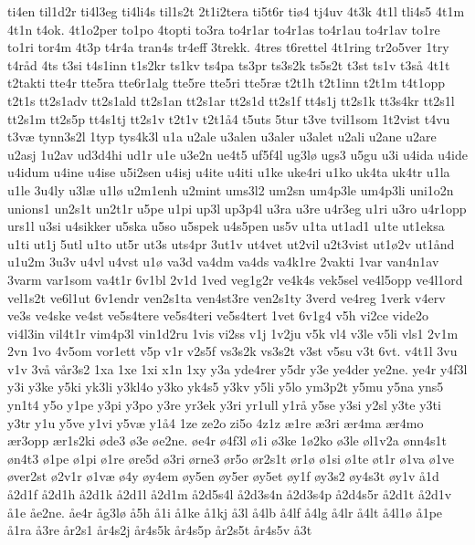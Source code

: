 {ti4en
til1d2r
ti4l3eg
ti4li4s
til1s2t
2t1i2tera
ti5t6r
ti^^f84
tj4uv
4t3k
4t1l
tli4s5
4t1m
4t1n
t4ok.
4t1o2per
to1po
4topti
to3ra
to4r1ar
to4r1as
to4r1au
to4r1av
to1re
to1ri
tor4m
4t3p
t4r4a
tran4s
tr4eff
3trekk.
4tres
t6rettel
4t1ring
tr2o5ver
1try
t4r^^e5d
4ts
t3si
t4s1inn
t1s2kr
ts1kv
ts4pa
ts3pr
ts3s2k
ts5s2t
t3st
ts1v
t3s^^e5
4t1t
t2takti
tte4r
tte5ra
tte6r1alg
tte5re
tte5ri
tte5r^^e6
t2t1h
t2t1inn
t2t1m
t4t1opp
t2t1s
tt2s1adv
tt2s1ald
tt2s1an
tt2s1ar
tt2s1d
tt2s1f
tt4s1j
tt2s1k
tt3s4kr
tt2s1l
tt2s1m
tt2s5p
tt4s1tj
tt2s1v
t2t1v
t2t1^^e54
t5uts
5tur
t3ve
tvil1som
1t2vist
t4vu
t3v^^e6
tynn3s2l
1typ
tys4k3l
u1a
u2ale
u3alen
u3aler
u3alet
u2ali
u2ane
u2are
u2asj
1u2av
ud3d4hi
ud1r
u1e
u3e2n
ue4t5
uf5f4l
ug3l^^f8
ugs3
u5gu
u3i
u4ida
u4ide
u4idum
u4ine
u4ise
u5i2sen
u4isj
u4ite
u4iti
u1ke
uke4ri
u1ko
uk4ta
uk4tr
u1la
u1le
3u4ly
u3l^^e6
u1l^^f8
u2m1enh
u2mint
ums3l2
um2sn
um4p3le
um4p3li
uni1o2n
unions1
un2s1t
un2t1r
u5pe
u1pi
up3l
up3p4l
u3ra
u3re
u4r3eg
u1ri
u3ro
u4r1opp
urs1l
u3si
u4sikker
u5ska
u5so
u5spek
u4s5pen
us5v
u1ta
ut1ad1
u1te
ut1eksa
u1ti
ut1j
5utl
u1to
ut5r
ut3s
uts4pr
3ut1v
ut4vet
ut2vil
u2t3vist
ut1^^f82v
ut1^^e5nd
u1u2m
3u3v
u4vl
u4vst
u1^^f8
va3d
va4dm
va4ds
va4k1re
2vakti
1var
van4n1av
3varm
var1som
va4t1r
6v1bl
2v1d
1ved
veg1g2r
ve4k4s
vek5sel
ve4l5opp
ve4l1ord
vel1s2t
ve6l1ut
6v1endr
ven2s1ta
ven4st3re
ven2s1ty
3verd
ve4reg
1verk
v4erv
ve3s
ve4ske
ve4st
ve5s4tere
ve5s4teri
ve5s4tert
1vet
6v1g4
v5h
vi2ce
vide2o
vi4l3in
vil4t1r
vim4p3l
vin1d2ru
1vis
vi2ss
v1j
1v2ju
v5k
vl4
v3le
v5li
vls1
2v1m
2vn
1vo
4v5om
vor1ett
v5p
v1r
v2s5f
vs3s2k
vs3s2t
v3st
v5su
v3t
6vt.
v4t1l
3vu
v1v
3v^^e5
v^^e5r3s2
1xa
1xe
1xi
x1n
1xy
y3a
yde4rer
y5dr
y3e
ye4der
ye2ne.
ye4r
y4f3l
y3i
y3ke
y5ki
yk3li
y3kl4o
y3ko
yk4s5
y3kv
y5li
y5lo
ym3p2t
y5mu
y5na
yns5
yn1t4
y5o
y1pe
y3pi
y3po
y3re
yr3ek
y3ri
yr1ull
y1r^^e5
y5se
y3si
y2sl
y3te
y3ti
y3tr
y1u
y5ve
y1vi
y5v^^e6
y1^^e54
1ze
ze2o
zi5o
4z1z
^^e61re
^^e63ri
^^e6r4ma
^^e6r4mo
^^e6r3opp
^^e6r1s2ki
^^f8de3
^^f83e
^^f8e2ne.
^^f8e4r
^^f84f3l
^^f81i
^^f83ke
1^^f82ko
^^f83le
^^f8l1v2a
^^f8nn4s1t
^^f8n4t3
^^f81pe
^^f81pi
^^f81re
^^f8re5d
^^f83ri
^^f8rne3
^^f8r5o
^^f8r2s1t
^^f8r1^^f8
^^f81si
^^f81te
^^f8t1r
^^f81va
^^f81ve
^^f8ver2st
^^f82v1r
^^f81v^^e6
^^f84y
^^f8y4em
^^f8y5en
^^f8y5er
^^f8y5et
^^f8y1f
^^f8y3s2
^^f8y4s3t
^^f8y1v
^^e51d
^^e52d1f
^^e52d1h
^^e52d1k
^^e52d1l
^^e52d1m
^^e52d5s4l
^^e52d3s4n
^^e52d3s4p
^^e52d4s5r
^^e52d1t
^^e52d1v
^^e51e
^^e5e2ne.
^^e5e4r
^^e5g3l^^f8
^^e55h
^^e51i
^^e51ke
^^e51kj
^^e53l
^^e54lb
^^e54lf
^^e54lg
^^e54lr
^^e54lt
^^e54l1^^f8
^^e51pe
^^e51ra
^^e53re
^^e5r2s1
^^e5r4s2j
^^e5r4s5k
^^e5r4s5p
^^e5r2s5t
^^e5r4s5v
^^e53t
}

